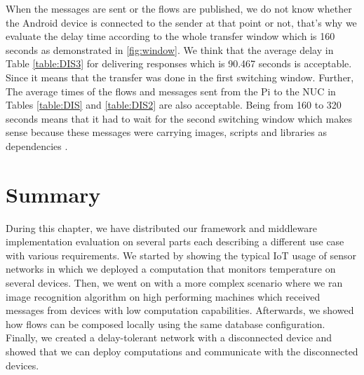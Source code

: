  \noindent When the messages are sent or the flows are published, we do not know whether the Android device is connected to the sender at that point or not, that's why we evaluate the delay time according to the whole transfer window which is 160 seconds as demonstrated in \ref{fig:window}.  We think that the average delay in Table \ref{table:DIS3}  for delivering responses which is  90.467 seconds is acceptable.  Since it means that the transfer was done in the first switching window. Further, The average times  of the flows and messages sent from the Pi to the NUC in Tables  \ref{table:DIS} and \ref{table:DIS2}  are also acceptable. Being from 160 to 320 seconds means that it had to wait for the second switching window which makes sense  because these messages were carrying images, scripts and libraries as dependencies .
\section{Summary}

During this chapter, we have distributed our framework and middleware implementation evaluation on several parts each describing a different use case with various requirements. We started by showing the typical IoT usage of sensor networks in which we deployed a computation that monitors temperature on several devices.  Then, we went on with a more complex scenario where we ran image recognition algorithm on high performing machines which received messages from devices with low computation capabilities. Afterwards, we showed how flows can be composed locally using the same database configuration. Finally, we created a delay-tolerant network with a disconnected device and showed that we can deploy computations and communicate with the disconnected devices.
